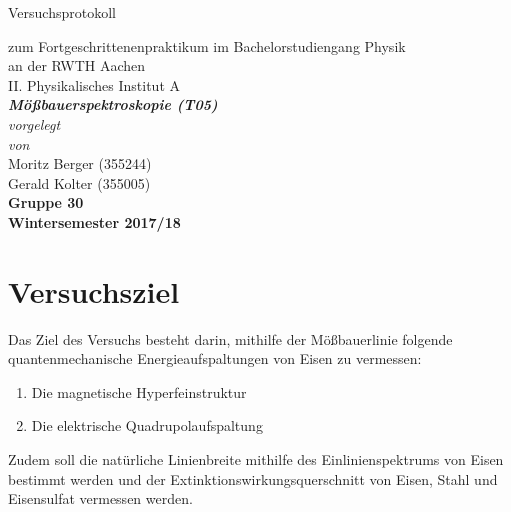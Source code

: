 \documentclass[12pt,a4paper]{article}
\author{Gerald}
\begin{document}
	\setlength{\parindent}{0pt} 
	\begin{center}
		{\LARGE Versuchsprotokoll}\\
		\begin{large}
			zum Fortgeschrittenenpraktikum im Bachelorstudiengang Physik\\[0.4cm]
			an der RWTH Aachen\\
			II. Physikalisches Institut A\\[5.5cm]
			\Large\textbf{\textsl{Mößbauerspektroskopie (T05)}}\\[5.5cm]
			\normalsize\textit{vorgelegt\\von}\\[0.4cm]
			\large{Moritz Berger (355244)\\Gerald Kolter (355005)}\\\textbf{Gruppe 30}\\[2cm]
			\large \textbf{Wintersemester 2017/18}
		\end{large}
	\end{center}
	\newpage
	
	\tableofcontents
	\newpage

\section{Versuchsziel}
Das Ziel des Versuchs besteht darin, mithilfe der Mößbauerlinie folgende quantenmechanische Energieaufspaltungen von Eisen zu vermessen:
\begin{enumerate}
\item Die magnetische Hyperfeinstruktur
\item Die elektrische Quadrupolaufspaltung
\end{enumerate}
Zudem soll die natürliche Linienbreite mithilfe des Einlinienspektrums von Eisen bestimmt werden und der Extinktionswirkungsquerschnitt von Eisen, Stahl und Eisensulfat vermessen werden.
\end{document}
